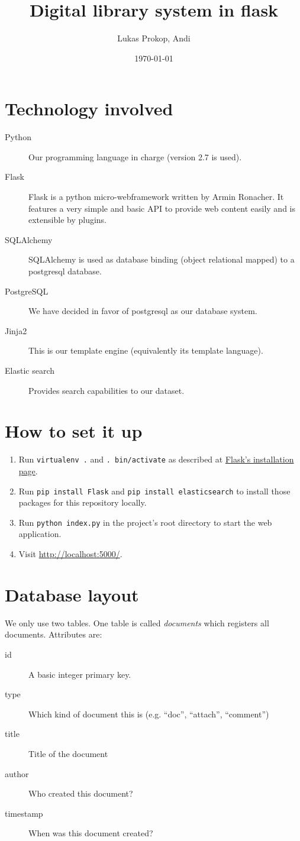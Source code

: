\documentclass{article}
\author{
    Lukas Prokop,
    Andi
}
\title{Digital library system in flask}
\date{\today}
\begin{document}
\maketitle
\tableofcontents

\section{Technology involved}
%
\begin{description}
  \item[Python]
    Our programming language in charge (version 2.7 is used).
  \item[Flask]
    Flask is a python micro-webframework written by Armin Ronacher.
    It features a very simple and basic API to provide web content easily
    and is extensible by plugins.
  \item[SQLAlchemy]
    SQLAlchemy is used as database binding (object relational mapped)
    to a postgresql database.
  \item[PostgreSQL]
    We have decided in favor of postgresql as our database system.
  \item[Jinja2]
    This is our template engine (equivalently its template language).
  \item[Elastic search]
    Provides search capabilities to our dataset.
\end{description}

\section{How to set it up}
%
\begin{enumerate}
  \item Run \texttt{virtualenv .} and \texttt{. bin/activate}
        as described at \href{http://flask.pocoo.org/docs/installation/#installation}%
        {Flask's installation page}.
  \item Run \texttt{pip install Flask} and \texttt{pip install elasticsearch}
        to install those packages for this repository locally.
  \item Run \texttt{python index.py} in the project's root directory to start the web application.
  \item Visit \url{http://localhost:5000/}.
\end{enumerate}

\section{Database layout}
%
We only use two tables. One table is called \emph{documents} which registers all documents. Attributes are:
\begin{description}
  \item[id] A basic integer primary key.
  \item[type] Which kind of document this is (e.g. ``doc'', ``attach'', ``comment'')
  \item[title] Title of the document
  \item[author] Who created this document?
  \item[timestamp] When was this document created?
\end{description}
\end{document}
